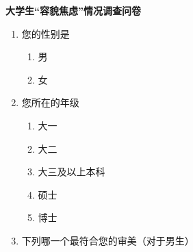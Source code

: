\begin{center}
    \large\textbf{大学生``容貌焦虑''情况调查问卷}
\end{center}
\begin{enumerate}[label=第\arabic{*}题、, leftmargin=7em]
    \item 您的性别是
    \begin{enumerate}[label=\Alph*.]
        \item 男
        \item 女
    \end{enumerate}

    \item 您所在的年级
    \begin{enumerate}[label=\Alph*.]
        \item 大一
        \item 大二
        \item 大三及以上本科
        \item 硕士
        \item 博士
    \end{enumerate}

    \item 下列哪一个最符合您的审美（对于男生）
    \setcounter{subfigure}{0}
    \begin{figure}[H]
        \centering
    \end{figure}




\end{enumerate}
